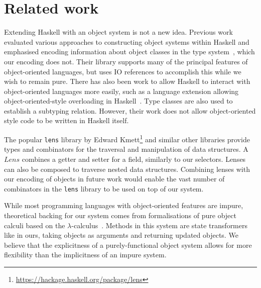 

\section{Related work}
\label{sec:related}

Extending Haskell with an object system is not a new idea. Previous work evaluated various approaches to constructing object systems within Haskell and emphasised encoding information about object classes in the type system~\cite{kiselyov2005haskell}, which our encoding does not. Their library supports many of the principal features of object-oriented languages, but uses IO references to accomplish this while we wish to remain pure. There has also been work to allow Haskell to interact with object-oriented languages more easily, such as a language extension allowing object-oriented-style overloading in Haskell~\cite{shields2001object}. Type classes are also used to establish a subtyping relation. However, their work does not allow object-oriented style code to be written in Haskell itself.

The popular \texttt{lens} library by Edward Kmett\footnote{\url{https://hackage.haskell.org/package/lens}} and similar other libraries provide types and combinators for the traversal and manipulation of data structures. A $\mathit{Lens}$ combines a getter and setter for a field, similarly to our selectors. Lenses can also be composed to traverse nested data structures.
Combining lenses with our encoding of objects in future work
would enable the vast number of combinators in the \texttt{lens} library to be used on top of our system.

While most programming languages with object-oriented features are impure, theoretical backing for our system comes from formalisations of pure object calculi based on the $\lambda$-calculus~\citet{pierce1994simple}. Methods in this system are state transformers like in ours, taking objects as arguments and returning updated objects. We believe that the explicitness of a purely-functional object system allows for more flexibility than the implicitness of an impure system.


